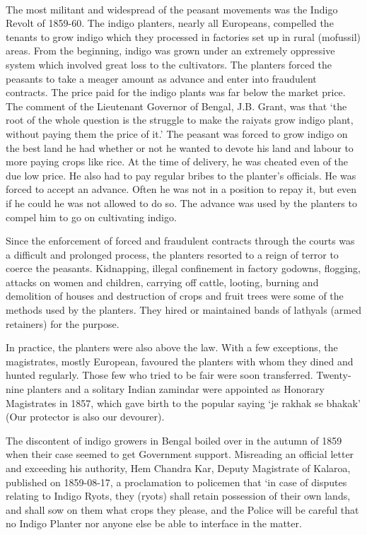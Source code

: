 \paragraph*{}
The most militant and widespread of the peasant movements was the Indigo Revolt of 1859-60. The indigo planters, nearly all Europeans, compelled the tenants to grow indigo which they processed in factories set up in rural (mofussil) areas. From the beginning, indigo was grown under an extremely oppressive system which involved great loss to the cultivators. The planters forced the peasants to take a meager amount as advance and enter into fraudulent contracts. The price paid for the indigo plants was far below the market price. The comment of the Lieutenant Governor of Bengal, J.B. Grant, was that `the root of the whole question is the struggle to make the raiyats grow indigo plant, without paying them the price of it.' The peasant was forced to grow indigo on the best land he had whether or not he wanted to devote his land and labour to more paying crops like rice. At the time of delivery, he was cheated even of the due low price. He also had to pay regular bribes to the planter's officials. He was forced to accept an advance. Often he was not in a position to repay it, but even if he could he was not allowed to do so. The advance was used by the planters to compel him to go on cultivating indigo.

Since the enforcement of forced and fraudulent contracts through the courts was a difficult and prolonged process, the planters resorted to a reign of terror to coerce the peasants. Kidnapping, illegal confinement in factory godowns, flogging, attacks on women and children, carrying off cattle, looting, burning and demolition of houses and destruction of crops and fruit trees were some of the methods used by the planters. They hired or maintained bands of lathyals (armed retainers) for the purpose.

In practice, the planters were also above the law. With a few exceptions, the magistrates, mostly European, favoured the planters with whom they dined and hunted regularly. Those few who tried to be fair were soon transferred. Twenty-nine planters and a solitary Indian zamindar were appointed as Honorary Magistrates in 1857, which gave birth to the popular saying `je rakhak se bhakak' (Our protector is also our devourer).

The discontent of indigo growers in Bengal boiled over in the autumn of 1859 when their case seemed to get Government support. Misreading an official letter and exceeding his authority, Hem Chandra Kar, Deputy Magistrate of Kalaroa, published on 1859-08-17, a proclamation to policemen that `in case of disputes relating to Indigo Ryots, they (ryots) shall retain possession of their own lands, and shall sow on them what crops they please, and the Police will be careful that no Indigo Planter nor anyone else be able to interface in the matter.

